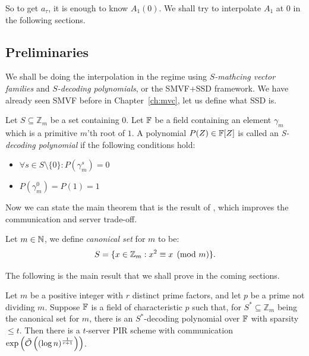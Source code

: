 So to get $a_{\tau}$, it is enough to know $A_1(0)$. We shall try to interpolate $A_1$ at $0$ in the following sections. 

\subsection{Preliminaries}

We shall be doing the interpolation in the regime using \emph{$S$-mathcing vector families} and \emph{$S$-decoding polynomials}, or the SMVF+SSD framework. We have already seen SMVF before in Chapter~\ref{ch:mvc}, let us define what SSD is.

\begin{definition}
    Let $S \subseteq \mathbb{Z}_m$ be a set containing $0$. Let $\mathbb{F}$ be a field containing an element $\gamma_m$ which is a primitive $m$'th root of $1$. A polynomial $P(Z) \in \mathbb{F}[Z]$ is called an \textit{S-decoding polynomial} if the following conditions hold:
\begin{itemize}
    \item $\forall s \in S \setminus \{0\}: P(\gamma_m^s) = 0$
    \item $P(\gamma_m^0) = P(1) = 1$
\end{itemize}
\end{definition}

Now we can state the main theorem that is the result of \cite{improved-pir}, which improves the communication and server trade-off.

\begin{definition}
    Let $m\in\mathbb{N}$, we define \emph{canonical set} for $m$ to be:
    \[
        S = \{x\in\mathbb{Z}_m : x^2 \equiv x\pmod m\}.    
    \] 
\end{definition}

The following is the main result that we shall prove in the coming sections.

\begin{blackbox}
    \begin{theorem}
        Let $m$ be a positive integer with $r$ distinct prime factors, and let $p$ be a prime not dividing $m$.
Suppose $\mathbb{F}$ is a field of characteristic $p$ such that, for $S^* \subseteq \mathbb{Z}_m$ being the canonical set for $m$, there is an $S^*$-decoding polynomial over $\mathbb{F}$ with sparsity $\leq t$.
Then there is a $t$-server PIR scheme with communication $\exp\left(\tilde{\mathcal{O}}\left((\log n)^{\frac{1}{r+1}}\right)\right)$.
    \end{theorem}
\end{blackbox}

